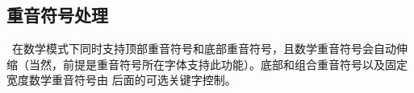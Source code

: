 %
%
%
%
%     
%
%
%

\subsection{重音符号处理}\label{mathacc}


\LUATEX\ 在数学模式下同时支持顶部重音符号和底部重音符号，且数学重音符号会自动伸缩（当然，前提是重音符号所在字体支持此功能）。底部和组合重音符号以及固定宽度数学重音符号由  后面的可选关键字控制。

